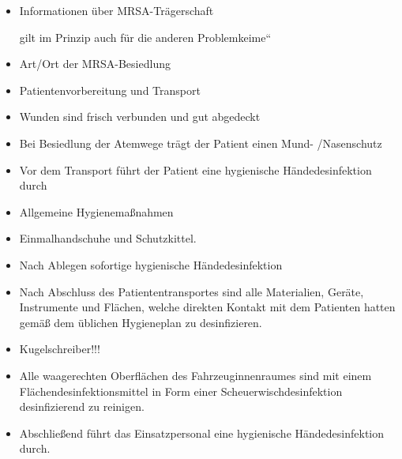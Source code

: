 \documentclass{article}
\newcommand\gH[1]{\textmd{\textcolor[rgb]{0.0,0.0,0.5019608}{#1}}}
\begin{document}
\label{bkm:RefHeading40262819}\begin{itemize}
\item {\mdseries
Informationen \"uber MRSA-Tr\"agerschaft}

\begin{center}
\begin{minipage}{4.941cm}
{\mdseries
\gH{ gilt im Prinzip auch f\"ur die anderen
{\quotedblbase}Problemkeime{\textquotedblleft}}}

\end{minipage}
\end{center}
\item {\mdseries
Art/Ort der MRSA-Besiedlung}

\item {\mdseries
Patientenvorbereitung und Transport}

\item {\mdseries
Wunden sind frisch verbunden und gut abgedeckt}

\item {\mdseries
Bei Besiedlung der Atemwege tr\"agt der Patient einen Mund-
/Nasenschutz}

\item {\mdseries
Vor dem Transport f\"uhrt der Patient eine hygienische
H\"andedesinfektion durch}

\item {\mdseries
Allgemeine Hygienema{\ss}nahmen}

\end{itemize}
\begin{itemize}
\item {\mdseries
Einmalhandschuhe und Schutzkittel.}

\item {\mdseries
Nach Ablegen sofortige hygienische H\"andedesinfektion  }

\end{itemize}
\begin{itemize}
\item {\mdseries
Nach Abschluss des Patiententransportes sind alle Materialien, Ger\"ate,
Instrumente und Fl\"achen, welche direkten Kontakt mit dem Patienten
hatten gem\"a{\ss} dem \"ublichen Hygieneplan zu desinfizieren.}

\end{itemize}
\begin{itemize}
\item {\mdseries
Kugelschreiber!!!}

\item {\mdseries
Alle waagerechten Oberfl\"achen des Fahrzeuginnenraumes sind mit einem
Fl\"achendesinfektionsmittel in Form einer Scheuerwischdesinfektion
desinfizierend zu reinigen.}

\item {\mdseries
Abschlie{\ss}end f\"uhrt das Einsatzpersonal eine hygienische
H\"andedesinfektion durch.}

\end{itemize}
\end{document}
